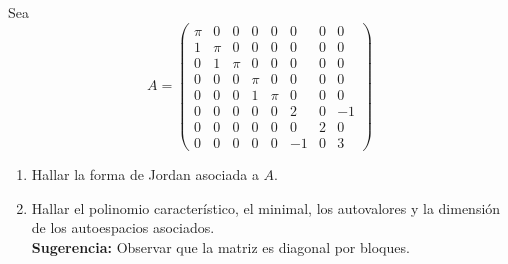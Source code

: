 \item Sea \[A=\begin{pmatrix}
        \pi&0&0&0&0&0&0&0\\
        1&\pi&0&0&0&0&0&0\\
        0&1&\pi&0&0&0&0&0\\
        0&0&0&\pi&0&0&0&0\\
        0&0&0&1&\pi&0&0&0\\
        0&0&0&0&0&2&0&-1\\
        0&0&0&0&0&0&2&0\\
        0&0&0&0&0&-1&0&3
    \end{pmatrix}\]
    \begin{enumerate}
        \item Hallar la forma de Jordan asociada a $A$.
            \begin{mdframed}[style=s]
                
            \end{mdframed}
        \item Hallar el polinomio característico, el minimal, los autovalores y la dimensión de los autoespacios asociados.\\
            \textbf{Sugerencia:} Observar que la matriz es diagonal por bloques.
            \begin{mdframed}[style=s]
                
            \end{mdframed}
    \end{enumerate}
